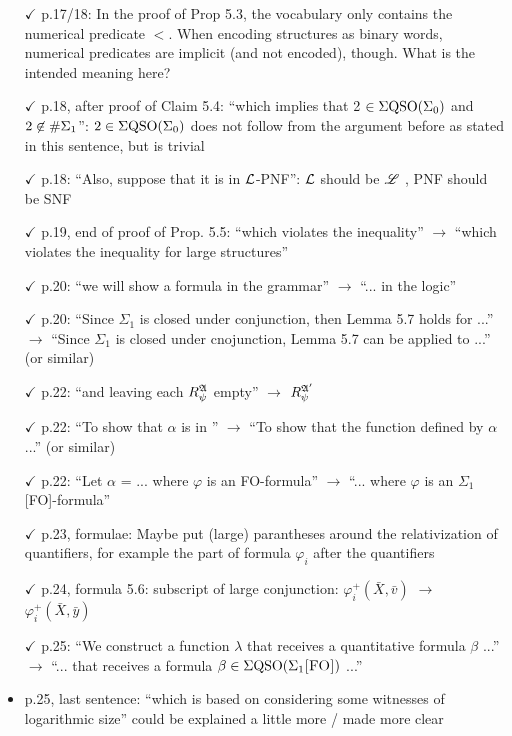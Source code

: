 \documentclass[a4paper]{article}
\begin{document}
\begin{itemize}
\item[$\checkmark$] p.17/18: In the proof of Prop 5.3, the vocabulary only contains the numerical predicate $<$. When encoding structures as binary words, numerical predicates are implicit (and not
encoded), though. What is the intended meaning here?
\item[$\checkmark$] p.18, after proof of Claim 5.4: ``which implies that 2 $\in \Sigma{\rm QSO}(\Sigma_0)$ and $2 \not\in \#\Sigma_{1}$'': $2 \in \Sigma{\rm QSO}(\Sigma_0)$
does not follow from the argument before as stated in this sentence, but is trivial
\item[$\checkmark$] p.18: ``Also, suppose that it is in $\mathcal{L}$-PNF'': $\mathcal{L}$ should be $\mathscr{L}$ , PNF should be SNF
\item[$\checkmark$] p.19, end of proof of Prop. 5.5: ``which violates the inequality'' $\to$ ``which violates the inequality
for large structures''
\item[$\checkmark$] p.20: ``we will show a formula in the grammar'' $\to$ ``... in the logic''
\item[$\checkmark$] p.20: ``Since $\Sigma_1$ is closed under conjunction, then Lemma 5.7 holds for ...'' $\to$ ``Since $\Sigma_1$ is
closed under cnojunction, Lemma 5.7 can be applied to ...'' (or similar)
\item[$\checkmark$] p.22: ``and leaving each $R_{\psi}^{\mathfrak{A}}$ empty'' $\to$ $R_{\psi}^{\mathfrak{A}'}$
\item[$\checkmark$] p.22: ``To show that $\alpha$ is in \totp'' $\to$ ``To show that the function defined by $\alpha$ ...'' (or similar)
\item[$\checkmark$] p.22: ``Let $\alpha$ = ... where $\varphi$ is an FO-formula'' $\to$ ``... where $\varphi$ is an $\Sigma_1$[FO]-formula''
\item[$\checkmark$] p.23, formulae: Maybe put (large) parantheses around the relativization of quantifiers, for
example the part of formula $\varphi_i$ after the quantifiers
\item[$\checkmark$] p.24, formula 5.6: subscript of large conjunction: $\varphi_i^{+}(\bar{X},\bar{v})$ $\to$ $\varphi_i^{+}(\bar{X},\bar{y})$
\item[$\checkmark$] p.25: ``We construct a function $\lambda$ that receives a quantitative formula $\beta$ ...'' $\to$ ``... that receives
a formula $\beta \in \Sigma{\rm QSO}(\Sigma_{1}\textsc{[FO]})$ ...''
\item p.25, last sentence: ``which is based on considering some witnesses of logarithmic size'' could
be explained a little more / made more clear

\end{itemize}
\end{document}

